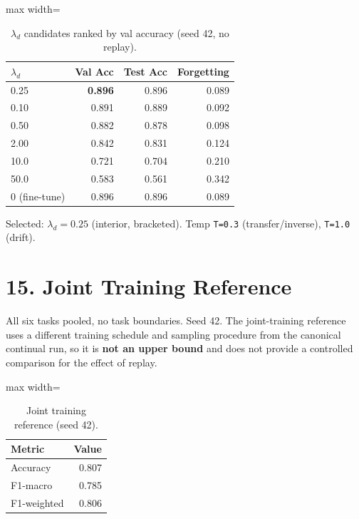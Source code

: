 \documentclass[11pt,a4paper]{article}
\begin{document}
\begin{table}[H]
\centering
\caption{$\lambda_d$ candidates ranked by val accuracy (seed 42, no replay).}
\label{tab:lambda-selection}
\begin{adjustbox}{max width=\textwidth}
\begin{tabular}{lrrr}
\toprule
$\lambda_d$ & Val Acc & Test Acc & Forgetting \\
\midrule
0.25 & \textbf{0.896} & 0.896 & 0.089 \\
0.10 & 0.891 & 0.889 & 0.092 \\
0.50 & 0.882 & 0.878 & 0.098 \\
2.00 & 0.842 & 0.831 & 0.124 \\
10.0 & 0.721 & 0.704 & 0.210 \\
50.0 & 0.583 & 0.561 & 0.342 \\
0 (fine-tune) & 0.896 & 0.896 & 0.089 \\
\bottomrule
\end{tabular}
\end{adjustbox}
\end{table}
Selected: $\lambda_d=\num{0.25}$ (interior, bracketed). Temp \texttt{T=0.3} (transfer/inverse), \texttt{T=1.0} (drift).

\section*{15. Joint Training Reference}
All six tasks pooled, no task boundaries. Seed 42. The joint-training reference uses a different training schedule and sampling procedure from the canonical continual run, so it is \textbf{not an upper bound} and does not provide a controlled comparison for the effect of replay.

\begin{table}[H]
\centering
\caption{Joint training reference (seed 42).}
\label{tab:joint}
\begin{adjustbox}{max width=\textwidth}
\begin{tabular}{lr}
\toprule
Metric & Value \\
\midrule
Accuracy & 0.807 \\
F1-macro & 0.785 \\
F1-weighted & 0.806 \\
\bottomrule
\end{tabular}
\end{adjustbox}
\end{table}
\end{document}

